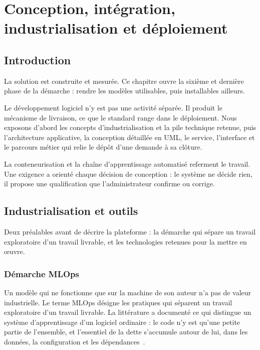 \chapter{Conception, intégration, industrialisation et déploiement}

\section*{Introduction}

La solution est construite et mesurée. Ce chapitre ouvre la sixième et dernière phase de la
démarche : rendre les modèles utilisables, puis installables ailleurs.

Le développement logiciel n'y est pas une activité séparée. Il produit le mécanisme de livraison,
ce que le standard range dans le déploiement. Nous exposons d'abord les concepts d'industrialisation
et la pile technique retenue, puis l'architecture applicative, la conception détaillée en UML, le
service, l'interface et le parcours métier qui relie le dépôt d'une demande à sa clôture.

La conteneurisation et la chaîne d'apprentissage automatisé referment le travail. Une exigence a
orienté chaque décision de conception : le système ne décide rien, il propose une qualification que
l'administrateur confirme ou corrige.

\section{Industrialisation et outils}

\label{sec:industrialisation7}

Deux préalables avant de décrire la plateforme : la démarche qui sépare un travail exploratoire
d'un travail livrable, et les technologies retenues pour la mettre en œuvre.

\subsection{Démarche MLOps}

Un modèle qui ne fonctionne que sur la machine de son auteur n'a pas de valeur industrielle. Le
terme MLOps désigne les pratiques qui séparent un travail exploratoire d'un travail livrable. La
littérature a documenté ce qui distingue un système d'apprentissage d'un logiciel ordinaire : le
code n'y est qu'une petite partie de l'ensemble, et l'essentiel de la dette s'accumule autour de
lui, dans les données, la configuration et les dépendances~\cite{sculley2015,amershi2019se}.

